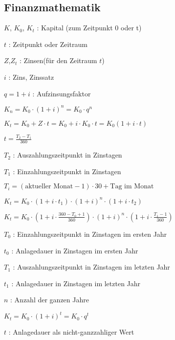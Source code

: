 \documentclass[
  ngerman,
  a4paper,
  landscape, fontsize=9pt, version=first, enabledeprecatedfontcommands,
  DIV=6]{scrartcl}
\providecommand{\tightlist}{%
  \setlength{\itemsep}{0pt}\setlength{\parskip}{0pt}}
\begin{document}
\begin{multicols}{3}
\hypertarget{finanzmathematik}{%
\subsection{Finanzmathematik}\label{finanzmathematik}}

\begin{description}
\tightlist
\item[Notationen]
\(K\), \(K_0\), \(K_t\) : Kapital (zum Zeitpunkt 0 oder t)

\(t\) : Zeitpunkt oder Zeitraum

\(Z\),\(Z_t\) : Zinsen(für den Zeitraum \(t\))

\(i\) : Zins, Zinssatz

\(q=1+i\) : Aufzinsungsfaktor
\item[Zinseszinsformel]
\(K_n = K_0 \cdot (1+i)^n = K_0 \cdot q^n\)
\item[Unterjährige Verzinsung]
\(K_t = K_0 + Z \cdot t = K_0 + i\cdot K_0 \cdot t = K_0 (1+i\cdot t)\)

\(t = \frac{T_2-T_1}{360}\)

\(T_2\) : Auszahlungszeitpunkt in Zinstagen

\(T_1\) : Einzahlungszeitpunkt in Zinstagen

\(T_i = (\text{aktueller Monat} - 1) \cdot 30 + \text{Tag im Monat}\)
\item[Gemischte Verzinsung]
\(K_t = K_0\cdot \left(1+i\cdot t_1\right)\cdot \left(1+i\right)^n\cdot \left(1+i\cdot t_2\right)\)

\(K_t = K_0\cdot \left(1+i\cdot \frac{360-T_0+1}{360}\right)\cdot \left(1+i\right)^n\cdot \left(1+i\cdot \frac{T_1-1}{360}\right)\)

\(T_0\) : Einzahlungszeitpunkt in Zinstagen im ersten Jahr

\(t_0\) : Anlagedauer in Zinstagen im ersten Jahr

\(T_1\) : Auszahlungszeitpunkt in Zinstagen im letzten Jahr

\(t_1\) : Anlagedauer in Zinstagen im letzten Jahr

\(n\) : Anzahl der ganzen Jahre
\item[Approximative Verzinsung]
\(K_t = K_0 \cdot (1+i)^t = K_0 \cdot q^t\)

\(t\) : Anlagedauer als nicht-ganzzahliger Wert
\end{description}

%
%
%
\end{multicols}
\end{document}
